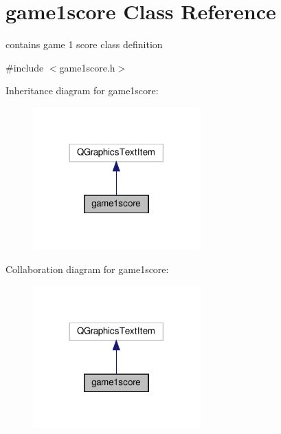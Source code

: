 \hypertarget{classgame1score}{}\section{game1score Class Reference}
\label{classgame1score}


contains game 1 score class definition  




{\ttfamily \#include $<$game1score.\+h$>$}



Inheritance diagram for game1score\+:\nopagebreak
\begin{figure}[H]
\begin{center}
\leavevmode
\includegraphics[width=182pt]{classgame1score__inherit__graph}
\end{center}
\end{figure}


Collaboration diagram for game1score\+:\nopagebreak
\begin{figure}[H]
\begin{center}
\leavevmode
\includegraphics[width=182pt]{classgame1score__coll__graph}
\end{center}
\end{figure}
